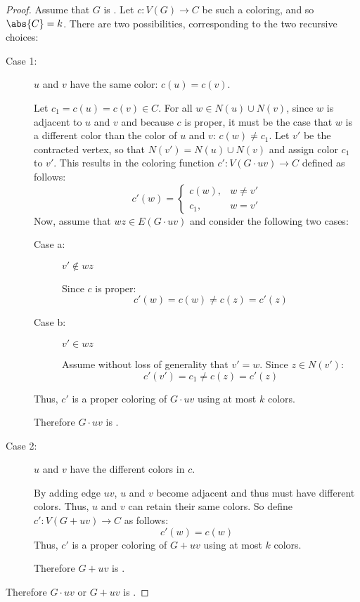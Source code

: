 \begin{proof}
  Assume that \(G\) is .  Let \(c:V(G)\to C\) be such a coloring, and so \(\abs{C}=k\).  There are two
  possibilities, corresponding to the two recursive choices:
  \begin{description}
  \item [Case 1:] \(u\) and \(v\) have the same color: \(c(u)=c(v)\).

    Let \(c_1=c(u)=c(v)\in C\).  For all \(w\in N(u)\cup N(v)\), since \(w\) is adjacent to \(u\) and \(v\) and
    because \(c\) is proper, it must be the case that \(w\) is a different color than the color of \(u\) and \(v\):
    \(c(w)\ne c_1\).  Let \(v'\) be the contracted vertex, so that \(N(v')=N(u)\cup N(v)\) and assign color \(c_1\)
    to \(v'\).  This results in the coloring function \(c':V(G\cdot uv)\to C\) defined as follows:
    \[c'(w)=\begin{cases}
    c(w), & w\ne v' \\
    c_1, & w=v'
    \end{cases}\]
    Now, assume that \(wz\in E(G\cdot uv)\) and consider the following two cases:
    \begin{description}
    \item[Case a:] \(v'\notin wz\)

      Since \(c\) is proper:
      \[c'(w)=c(w)\ne c(z)=c'(z)\]
    \item[Case b:] \(v'\in wz\)

      Assume without loss of generality that \(v'=w\).  Since \(z\in N(v')\):
      \[c'(v')=c_1\ne c(z)=c'(z)\]
    \end{description}

    Thus, \(c'\) is a proper coloring of \(G\cdot uv\) using at most \(k\) colors.

    Therefore \(G\cdot uv\) is .
      
  \item [Case 2:] \(u\) and \(v\) have the different colors in \(c\).

    By adding edge \(uv\), \(u\) and \(v\) become adjacent and thus must have different colors.  Thus, \(u\)
    and \(v\) can retain their same colors.  So define \(c':V(G+uv)\to C\) as follows:
    \[c'(w)=c(w)\]
    Thus, \(c'\) is a proper coloring of \(G+uv\) using at most \(k\) colors.

    Therefore \(G+uv\) is .
  \end{description}

  Therefore \(G\cdot uv\) or \(G+uv\) is .
    

\end{proof}
